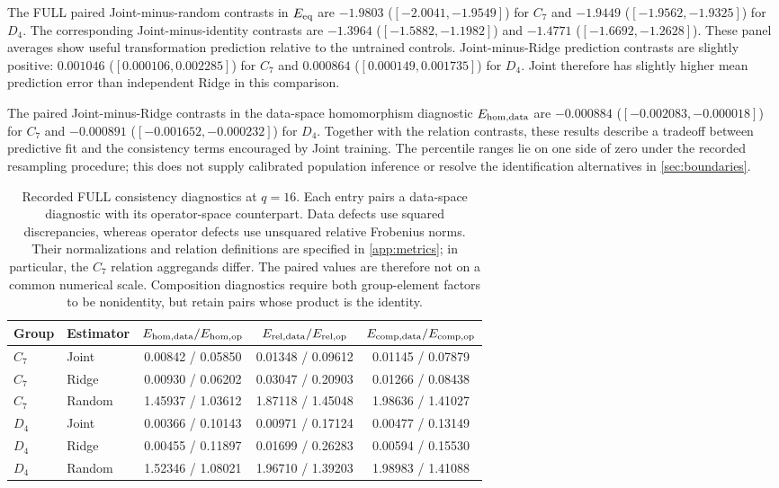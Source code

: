 The FULL paired Joint-minus-random contrasts in $E_{\mathrm{eq}}$
are $-1.9803$ ($[-2.0041,-1.9549]$) for $C_7$ and
$-1.9449$ ($[-1.9562,-1.9325]$) for $D_4$.
The corresponding Joint-minus-identity contrasts are
$-1.3964$ ($[-1.5882,-1.1982]$) and
$-1.4771$ ($[-1.6692,-1.2628]$).
These panel averages show useful transformation prediction
relative to the untrained controls.
Joint-minus-Ridge prediction contrasts are slightly
positive:
$0.001046$ ($[0.000106,0.002285]$) for $C_7$ and
$0.000864$ ($[0.000149,0.001735]$) for $D_4$.
Joint therefore has slightly higher mean prediction error
than independent Ridge in this comparison.

The paired Joint-minus-Ridge contrasts in the data-space
homomorphism diagnostic $E_{\mathrm{hom,data}}$ are
$-0.000884$ ($[-0.002083,-0.000018]$) for $C_7$ and
$-0.000891$ ($[-0.001652,-0.000232]$) for $D_4$.
Together with the relation contrasts, these results
describe a tradeoff between predictive fit and the
consistency terms encouraged by Joint training.
The percentile ranges lie on one side of zero under
the recorded resampling procedure; this does not supply
calibrated population inference or resolve the
identification alternatives in \cref{sec:boundaries}.

\begin{table}[t]
\caption{
Recorded FULL consistency diagnostics at $q=16$.
Each entry pairs a data-space diagnostic with its
operator-space counterpart.
Data defects use squared discrepancies, whereas operator
defects use unsquared relative Frobenius norms.
Their normalizations and relation definitions are
specified in \cref{app:metrics}; in particular, the
$C_7$ relation aggregands differ.
The paired values are therefore not on a common
numerical scale.
Composition diagnostics require both group-element
factors to be nonidentity, but retain pairs whose
product is the identity.
}
\label{tab:full-diagnostics}
\centering
\small
\begin{tabular}{llccc}
\toprule
Group & Estimator
& $E_{\mathrm{hom,data}}/E_{\mathrm{hom,op}}$
& $E_{\mathrm{rel,data}}/E_{\mathrm{rel,op}}$
& $E_{\mathrm{comp,data}}/E_{\mathrm{comp,op}}$ \\
\midrule
$C_7$ & Joint
& 0.00842 / 0.05850
& 0.01348 / 0.09612
& 0.01145 / 0.07879 \\
$C_7$ & Ridge
& 0.00930 / 0.06202
& 0.03047 / 0.20903
& 0.01266 / 0.08438 \\
$C_7$ & Random
& 1.45937 / 1.03612
& 1.87118 / 1.45048
& 1.98636 / 1.41027 \\
$D_4$ & Joint
& 0.00366 / 0.10143
& 0.00971 / 0.17124
& 0.00477 / 0.13149 \\
$D_4$ & Ridge
& 0.00455 / 0.11897
& 0.01699 / 0.26283
& 0.00594 / 0.15530 \\
$D_4$ & Random
& 1.52346 / 1.08021
& 1.96710 / 1.39203
& 1.98983 / 1.41088 \\
\bottomrule
\end{tabular}
\end{table}

